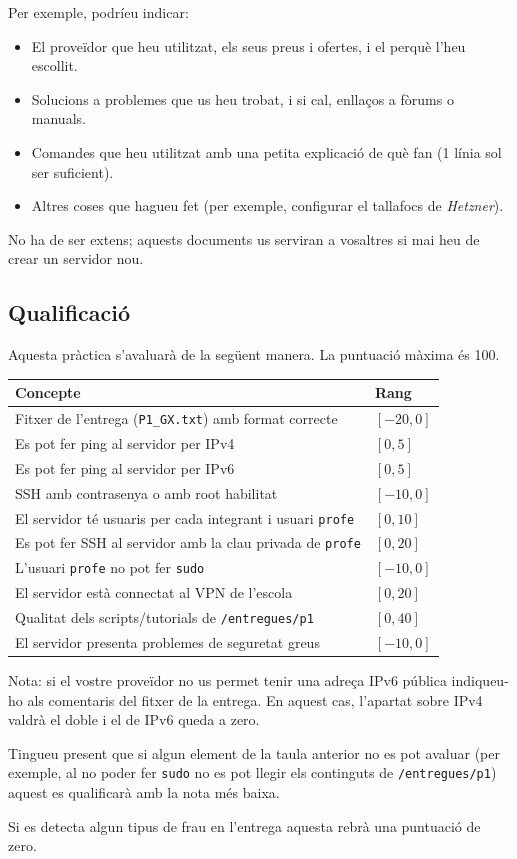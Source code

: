 \documentclass{practicaitic}
\begin{document}
Per exemple, podríeu indicar:
\begin{itemize}
  \item El proveïdor que heu utilitzat, els seus preus i ofertes, i el perquè l'heu escollit.
  \item Solucions a problemes que us heu trobat, i si cal, enllaços a fòrums o manuals.
  \item Comandes que heu utilitzat amb una petita explicació de què fan (1 línia sol ser suficient).
  \item Altres coses que hagueu fet (per exemple, configurar el tallafocs de \textit{Hetzner}).
\end{itemize}

No ha de ser extens; aquests documents us serviran a vosaltres si mai heu de
crear un servidor nou.

\newpage %
\subsection{Qualificació}

Aquesta pràctica s'avaluarà de la següent manera. La puntuació màxima és 100.

\begin{center}
  \begin{tabular}{ll}
  \hline
  Concepte & Rang \\ \hline
  Fitxer de l'entrega (\texttt{P1\_GX.txt}) amb format correcte & $[-20, 0]$ \\
  Es pot fer ping al servidor per IPv4 & $[0, 5]$ \\
  Es pot fer ping al servidor per IPv6 & $[0, 5]$ \\
  SSH amb contrasenya o amb root habilitat & $[-10, 0]$ \\
  El servidor té usuaris per cada integrant i usuari \texttt{profe} & $[0, 10]$ \\
  Es pot fer SSH al servidor amb la clau privada de \texttt{profe} & $[0, 20]$ \\
  L'usuari \texttt{profe} no pot fer \texttt{sudo} & $[-10,0]$ \\
  El servidor està connectat al VPN de l'escola & $[0, 20]$ \\
  Qualitat dels scripts/tutorials de \texttt{/entregues/p1} & $[0,40]$ \\
  El servidor presenta problemes de seguretat greus & $[-10,0]$ \\
  \hline
  \end{tabular}
\end{center}

Nota: si el vostre proveïdor no us permet tenir una adreça IPv6 pública
indiqueu-ho als comentaris del fitxer de la entrega. En aquest cas, l'apartat
sobre IPv4 valdrà el doble i el de IPv6 queda a zero.

Tingueu present que si algun element de la taula anterior no es pot avaluar
(per exemple, al no poder fer \texttt{sudo} no es pot llegir els continguts de \texttt{/entregues/p1})
aquest es qualificarà amb la nota més baixa.

Si es detecta algun tipus de frau en l'entrega aquesta rebrà una puntuació de zero.
\end{document}
